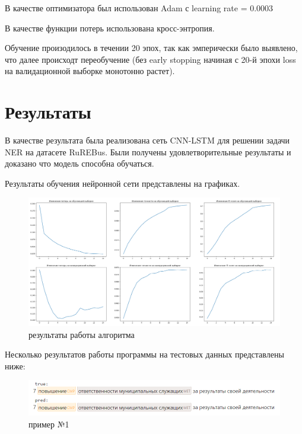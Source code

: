 \documentclass{article}
\begin{document}
В качестве оптимизатора был использован Adam с learning rate = 0.0003

В качестве функции потерь использована кросс-энтропия.

Обучение произодилось в течении 20 эпох, так как эмперически было выявлено, что далее происходт переобучение (без early stopping начиная с 20-й эпохи loss на валидационной выборке монотонно растет).


\section{Результаты}
В качестве результата была реализована сеть CNN-LSTM для решении задачи NER на датасете RuREBus. Были получены удовлетворительные результаты и доказано что модель способна обучаться.

Результаты обучения нейронной сети представлены на графиках.

\begin{figure}[!tbh]
    \centering
    \includegraphics[width=0.9\linewidth]{res.png}
    \caption{результаты работы алгоритма}
    \label{fig:circle}
\end{figure}

Несколько результатов работы программы на тестовых данных представлены ниже: 
\begin{figure}[!tbh]
    \centering
    \includegraphics[width=0.9\linewidth]{exm1.png}
    \caption{пример №1}
    \label{fig:circle}
\end{figure}
\end{document}
